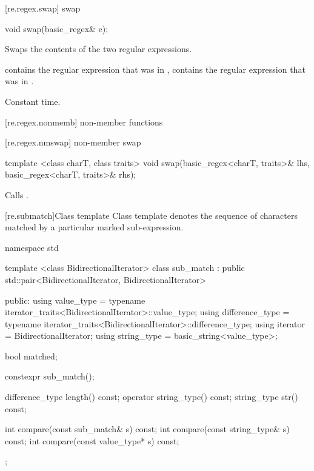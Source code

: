 [re.regex.swap]{ swap}
%

%
\begin{itemdecl}
void swap(basic_regex& e); 
\end{itemdecl}

\begin{itemdescr}
\pnum\effects  Swaps the contents of the two regular expressions. 

\pnum\postcondition  {} contains the regular expression
that was in ,  contains the regular expression that
was in . 

\pnum\complexity Constant time. 
\end{itemdescr}

[re.regex.nonmemb]{ non-member functions}

[re.regex.nmswap]{ non-member swap}
%
\begin{itemdecl}
template <class charT, class traits>
  void swap(basic_regex<charT, traits>& lhs, basic_regex<charT, traits>& rhs); 
\end{itemdecl}

\begin{itemdescr}
\pnum\effects  Calls .
\end{itemdescr}

[re.submatch]{Class template }
\pnum
{}%
Class template  denotes the sequence of characters matched
by a particular marked sub-expression.

\begin{codeblock}
namespace std {
  template <class BidirectionalIterator>
  class sub_match : public std::pair<BidirectionalIterator, BidirectionalIterator> {
  public:
     using value_type      =
             typename iterator_traits<BidirectionalIterator>::value_type;
     using difference_type =
             typename iterator_traits<BidirectionalIterator>::difference_type;
     using iterator        = BidirectionalIterator;
     using string_type     = basic_string<value_type>;

     bool matched;

     constexpr sub_match();

     difference_type length() const;
     operator string_type() const;
     string_type str() const;

     int compare(const sub_match& s) const;
     int compare(const string_type& s) const;
     int compare(const value_type* s) const;
  }; 
}
\end{codeblock}


